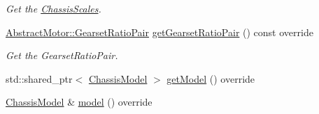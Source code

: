 \begin{DoxyCompactItemize}
\begin{DoxyCompactList}\small\item\em Get the \mbox{\hyperlink{classokapi_1_1ChassisScales}{Chassis\+Scales}}. \end{DoxyCompactList}\item 
\mbox{\hyperlink{structokapi_1_1AbstractMotor_1_1GearsetRatioPair}{Abstract\+Motor\+::\+Gearset\+Ratio\+Pair}} \mbox{\hyperlink{classokapi_1_1MockChassisController_a78359e0cc41856703fe9b0d3dc414b13}{get\+Gearset\+Ratio\+Pair}} () const override
\begin{DoxyCompactList}\small\item\em Get the Gearset\+Ratio\+Pair. \end{DoxyCompactList}\item 
std\+::shared\+\_\+ptr$<$ \mbox{\hyperlink{classokapi_1_1ChassisModel}{Chassis\+Model}} $>$ \mbox{\hyperlink{classokapi_1_1MockChassisController_a8c502c38c9547c425d7e47d849c05380}{get\+Model}} () override
\item 
\mbox{\hyperlink{classokapi_1_1ChassisModel}{Chassis\+Model}} \& \mbox{\hyperlink{classokapi_1_1MockChassisController_af70bde7c9c24071c7fa052d99c0e6059}{model}} () override
\end{DoxyCompactItemize}
